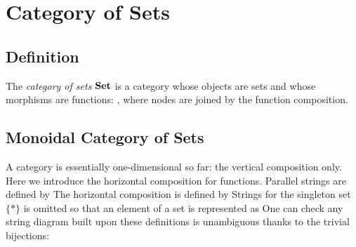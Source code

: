 \section{Category of Sets}

\subsection{Definition}

The \emph{category of sets} $\boldsymbol{\mathrm{Set}}$ is a category whose objects are sets and whose morphisms are functions:
, where nodes are joined by the function composition. 


\subsection{Monoidal Category of Sets}

A category is essentially one-dimensional so far: the vertical composition only. %
Here we introduce the horizontal composition for functions. Parallel strings are defined by
The horizontal composition is defined by
Strings for the singleton set $\lbrace \ast\rbrace$ is omitted so that an element of a set is represented as
One can check any string diagram built upon these definitions is unambiguous thanks to the trivial bijections:



